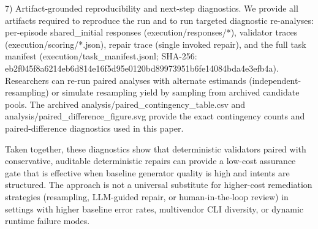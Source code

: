 \documentclass[conference]{IEEEtran}
\begin{document}
7) Artifact-grounded reproducibility and next-step diagnostics. We provide all artifacts required to reproduce the run and to run targeted diagnostic re-analyses: per-episode shared\_initial responses (execution/responses/*), validator traces (execution/scoring/*.json), repair trace (single invoked repair), and the full task manifest (execution/task\_manifest.jsonl; SHA-256: eb2f045f\allowbreak{}8a6214eb\allowbreak{}6d814e16\allowbreak{}f5d95e01\allowbreak{}20bd8997\allowbreak{}3951b6fe\allowbreak{}14084bda\allowbreak{}4e3efb4a). Researchers can re-run paired analyses with alternate estimands (independent-resampling) or simulate resampling yield by sampling from archived candidate pools. The archived analysis/paired\_contingency\_table.csv and analysis/paired\_difference\_figure.svg provide the exact contingency counts and paired-difference diagnostics used in this paper.

Taken together, these diagnostics show that deterministic validators paired with conservative, auditable deterministic repairs can provide a low-cost assurance gate that is effective when baseline generator quality is high and intents are structured. The approach is not a universal substitute for higher-cost remediation strategies (resampling, LLM-guided repair, or human-in-the-loop review) in settings with higher baseline error rates, multivendor CLI diversity, or dynamic runtime failure modes.
\end{document}
